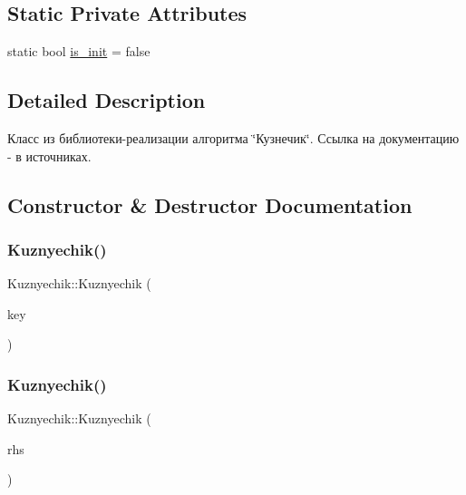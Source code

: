 \subsection*{Static Private Attributes}
\begin{DoxyCompactItemize}
\item 
static bool \hyperlink{class_kuznyechik_ad174f2e619e033cc9f29a265825aba41}{is\+\_\+init} = false
\end{DoxyCompactItemize}


\subsection{Detailed Description}
Класс из библиотеки-\/реализации алгоритма \char`\"{}Кузнечик\char`\"{}. Ссылка на документацию -\/ в источниках. 

\subsection{Constructor \& Destructor Documentation}
\mbox{\label{class_kuznyechik_a3fa49cd54a47b9cc2d5a32beabd05264}} 
\subsubsection{\texorpdfstring{Kuznyechik()}{Kuznyechik()}\hspace{0.1cm}{\footnotesize\ttfamily [1/2]}}
{\footnotesize\ttfamily Kuznyechik\+::\+Kuznyechik (\begin{DoxyParamCaption}\item[{const \hyperlink{class_byte_block}{Byte\+Block} \&}]{key }\end{DoxyParamCaption})}

\mbox{\label{class_kuznyechik_a8e3a616991d823600e38d4a974124d1d}} 
\subsubsection{\texorpdfstring{Kuznyechik()}{Kuznyechik()}\hspace{0.1cm}{\footnotesize\ttfamily [2/2]}}
{\footnotesize\ttfamily Kuznyechik\+::\+Kuznyechik (\begin{DoxyParamCaption}\item[{const \hyperlink{class_kuznyechik}{Kuznyechik} \&}]{rhs }\end{DoxyParamCaption})}

